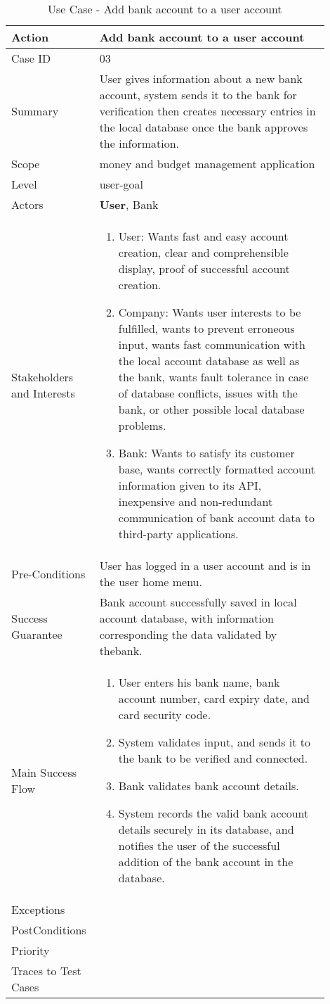 \documentclass[11pt]{article}
\newcounter{use case ID}
\newcommand\tabularhead[1]{
\begin{table}[ht]
    \addtocounter{use case ID}{1}
    \caption{Use Case \arabic{use case ID} - #1}
    \vspace{0.2cm}
    \begin{tabular}{|p{0.2\linewidth}|p{0.70\linewidth}|}
    \hline
        \textbf{Action} & \textbf{#1} \\
        \hline}
\newcommand\addrow[2]{#1 & #2\\ \hline}
\newcommand\addmulrow[2]{ \begin{minipage}[t][][t]{2.5cm}#1\end{minipage}
        &\begin{minipage}[t][][t]{11cm}
        \begin{enumerate}[itemsep=-1ex] #2   \end{enumerate}
    \end{minipage}\vfill\\ \hline}
\newenvironment{usecase}{\tabularhead}
{\hline\end{tabular}\end{table}}
\begin{document}
\begin{usecase}{Add bank account to a user account}
    \addrow{Case ID}{03}
    \addrow{Summary}{User gives information about a new bank account, system sends it to the bank for verification then creates necessary entries in the local database once the bank approves the information.}
    \addrow{Scope}{money and budget management application}
    \addrow{Level}{user-goal}
    \addrow{Actors}{\textbf{User}, Bank}
    \addmulrow{Stakeholders and Interests}{
        \item User: Wants fast and easy account creation, clear and comprehensible display, proof of successful account creation.
        \item Company: Wants user interests to be fulfilled, wants to prevent erroneous input, wants fast communication with the local account database as well as the bank, wants fault tolerance in case of database conflicts, issues with the bank, or other possible local database problems.
        \item Bank: Wants to satisfy its customer base, wants correctly formatted account information given to its API, inexpensive and non-redundant communication of bank account data to third-party applications.}
    \addrow{Pre-Conditions}{User has logged in a user account and is in the user home menu.}
    \addrow{Success Guarantee}{Bank account successfully saved in local account database, with information corresponding the data validated by thebank.}
    \addmulrow{Main Success Flow}{
        \item User enters his bank name, bank account number, card expiry date, and card security code.
        \item System validates input, and sends it to the bank to be verified and connected.
        \item Bank validates bank account details.
        \item System records the valid bank account details securely in its database, and notifies the user of the successful addition of the bank account in the database.}
    \addrow{Exceptions}{}
    \addrow{PostConditions}{}
    \addrow{Priority}{}
    \addrow{Traces to Test Cases}{}
\end{usecase}
\end{document}
